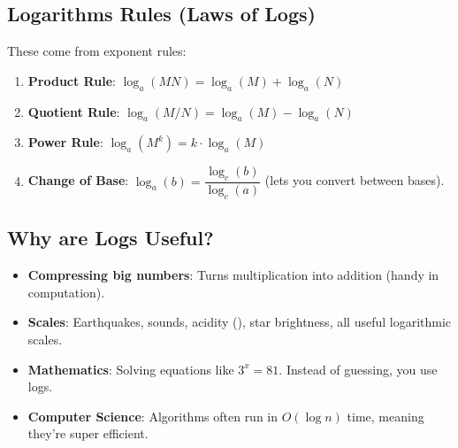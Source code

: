 \subsection{Logarithms Rules (Laws of Logs)}

These come from exponent rules:

\begin{enumerate}
	\item \textbf{Product Rule}: $\log_{a}(MN) = \log_{a}(M) + \log_{a}(N)$
	      \vspace{2pt}
	\item \textbf{Quotient Rule}: $\log_{a}(M/N) = \log_{a}(M) - \log_{a}(N)$
	      \vspace{2pt}
	\item \textbf{Power Rule}: $\log_{a}(M^k) = k \cdot \log_{a}(M)$
	      \vspace{4pt}
	\item \textbf{Change of Base}: $\log_{a}(b) = \dfrac{\log_{c}(b)}{\log_{c}(a)}$ (lets you convert between bases).
\end{enumerate}

\subsection{Why are Logs Useful?}

\begin{itemize}
	\item \textbf{Compressing big numbers}: Turns multiplication into addition (handy in computation).
	      \vspace{2pt}
	\item \textbf{Scales}: Earthquakes, sounds, acidity (), star brightness, all useful logarithmic scales.
	\item \textbf{Mathematics}: Solving equations like $3^x = 81$. Instead of guessing, you use logs.
	\item \textbf{Computer Science}: Algorithms often run in $O(\log n)$ time, meaning they're super efficient.
\end{itemize}
